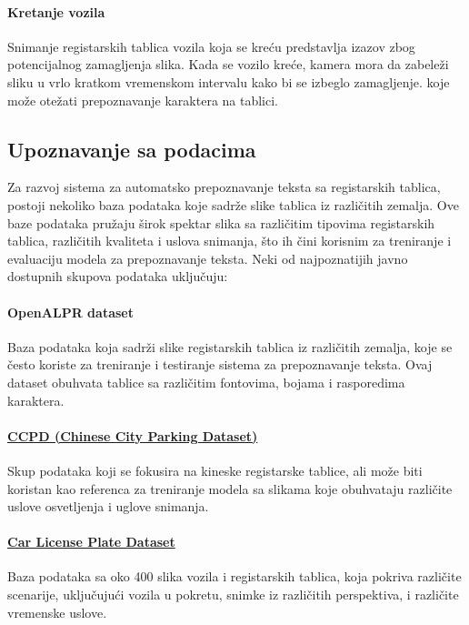 \documentclass[a4paper,12pt]{article}
\begin{document}
	\paragraph{Kretanje vozila}
	Snimanje registarskih tablica vozila koja se kreću predstavlja izazov zbog potencijalnog zamagljenja slika. Kada se vozilo kreće, kamera mora da zabeleži sliku u vrlo kratkom vremenskom intervalu kako bi se izbeglo zamagljenje. koje može otežati prepoznavanje karaktera na tablici.
	
	\subsection{Upoznavanje sa podacima}
	Za razvoj sistema za automatsko prepoznavanje teksta sa registarskih tablica, postoji nekoliko baza podataka koje sadrže slike tablica iz različitih zemalja. Ove baze podataka pružaju širok spektar slika sa različitim tipovima registarskih tablica, različitih kvaliteta i uslova snimanja, što ih čini korisnim za treniranje i evaluaciju modela za prepoznavanje teksta. Neki od najpoznatijih javno dostupnih skupova podataka uključuju:
		
	\paragraph{OpenALPR dataset}
	Baza podataka koja sadrži slike registarskih tablica iz različitih zemalja, koje se često koriste za treniranje i testiranje sistema za prepoznavanje teksta. Ovaj dataset obuhvata tablice sa različitim fontovima, bojama i rasporedima karaktera.
	
	\paragraph{\href{https://github.com/detectRecog/CCPD}{CCPD (Chinese City Parking Dataset)}}
	Skup podataka koji se fokusira na kineske registarske tablice, ali može biti koristan kao referenca za treniranje modela sa slikama koje obuhvataju različite uslove osvetljenja i uglove snimanja.
	
	\paragraph{\href{https://datasetninja.com/car-license-plate}{Car License Plate Dataset}}
	Baza podataka sa oko 400 slika vozila i registarskih tablica, koja pokriva različite scenarije, uključujući vozila u pokretu, snimke iz različitih perspektiva, i različite vremenske uslove. \newline
	
\end{document}
